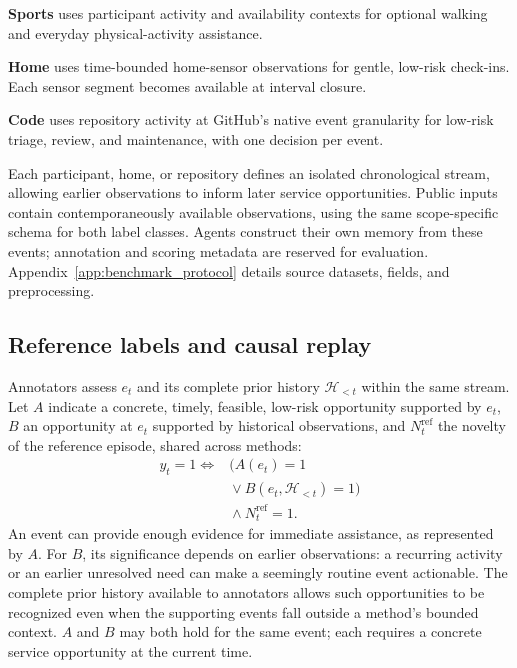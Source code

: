 \hspace*{\parindent}\textbf{Sports} uses participant activity and availability contexts for optional walking and everyday physical-activity assistance.

\textbf{Home} uses time-bounded home-sensor observations for gentle, low-risk check-ins.
Each sensor segment becomes available at interval closure.

\textbf{Code} uses repository activity at GitHub's native event granularity for low-risk triage, review, and maintenance, with one decision per event.

Each participant, home, or repository defines an isolated chronological stream, allowing earlier observations to inform later service opportunities.
Public inputs contain contemporaneously available observations, using the same scope-specific schema for both label classes.
Agents construct their own memory from these events; annotation and scoring metadata are reserved for evaluation.
Appendix~\ref{app:benchmark_protocol} details source datasets, fields, and preprocessing.

\subsection{Reference labels and causal replay}
\label{sec:reference_labels}

Annotators assess $e_t$ and its complete prior history $\mathcal{H}_{<t}$ within the same stream.
Let $A$ indicate a concrete, timely, feasible, low-risk opportunity supported by $e_t$, $B$ an opportunity at $e_t$ supported by historical observations, and $N_t^{\mathrm{ref}}$ the novelty of the reference episode, shared across methods:
\begin{equation}
\begin{aligned}
y_t=1 \iff {} & \big(A(e_t)=1\\
& {}\lor B(e_t,\mathcal{H}_{<t})=1\big)\\
& {}\land N_t^{\mathrm{ref}}=1.
\end{aligned}
\label{eq:or_semantics}
\end{equation}
An event can provide enough evidence for immediate assistance, as represented by $A$.
For $B$, its significance depends on earlier observations: a recurring activity or an earlier unresolved need can make a seemingly routine event actionable.
The complete prior history available to annotators allows such opportunities to be recognized even when the supporting events fall outside a method's bounded context.
$A$ and $B$ may both hold for the same event; each requires a concrete service opportunity at the current time.

